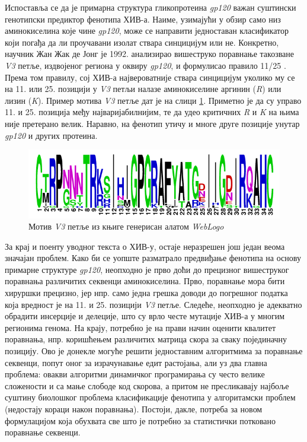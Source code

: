 \documentclass[12pt,oneside]{memoir}
\begin{document}
\begin{CJK}{UTF8}{ipxm}
Испоставља се да је примарна структура гликопротеина \textit{gp120} важан суштински генотипски предиктор фенотипа ХИВ-а. Наиме, узимајући у обзир само низ аминокиселина које чине \textit{gp120}, може се направити једноставан класификатор који погађа да ли проучавани изолат ствара синцицијум или не. Конкретно, научник Жан Жак де Јонг је 1992. анализирао вишеструко поравнање такозване \textit{V3} петље, издвојеног региона у оквиру \textit{gp120}, и формулисао правило 11/25 \cite{jong1992}. Према том правилу, сој ХИВ-а највероватније ствара синцицијум уколико му се на 11. или 25. позицији у \textit{V3} петљи налазе аминокиселине аргинин (\textit{R}) или лизин (\textit{K}). Пример мотива \textit{V3} петље дат је на слици \ref{fig:motif}. Приметно је да су управо 11. и 25. позиција међу најваријабилнијим, те да удео критичних \textit{R} и \textit{K} на њима није претерано велик. Наравно, на фенотип утичу и многе друге позиције унутар \textit{gp120} и других протеина.

\begin{figure}[H]
  \centering
  \includegraphics[width=.75\textwidth]{motif.png}
  \caption[]{Мотив \textit{V3} петље из књиге \cite{compeau2015} генерисан алатом \textit{WebLogo}\footnotemark}
  \label{fig:motif}
\end{figure}


За крај и поенту уводног текста о ХИВ-у, остаје неразрешен још један веома значајан проблем. Како би се уопште разматрало предвиђање фенотипа на основу примарне структуре \textit{gp120}, неопходно је прво доћи до прецизног вишеструког поравнања различитих секвенци аминокиселина. Прво, поравнање мора бити хируршки прецизно, јер нпр. само једна грешка доводи до погрешног податка која вредност је на 11. и 25. позицији \textit{V3} петље. Следеће, неопходно је адекватно обрадити инсерције и делеције, што су врло честе мутације ХИВ-а у многим регионима генома. На крају, потребно је на прави начин оценити квалитет поравнања, нпр. коришћењем различитих матрица скора за сваку појединачну позицију. Ово је донекле могуће решити једноставним алгоритмима за поравнање секвенци, попут оног за израчунавање едит растојања, али уз два главна проблема: овакви алгоритми динамичког програмирања су често велике сложености и са мање слободе код скорова, а притом не пресликавају најбоље суштину биолошког проблема класификације фенотипа у алгоритамски проблем (недостају кораци након поравнања). Постоји, дакле, потреба за новом формулацијом која обухвата све што је потребно за статистички потковано поравнање секвенци.


\end{CJK}
\end{document}
